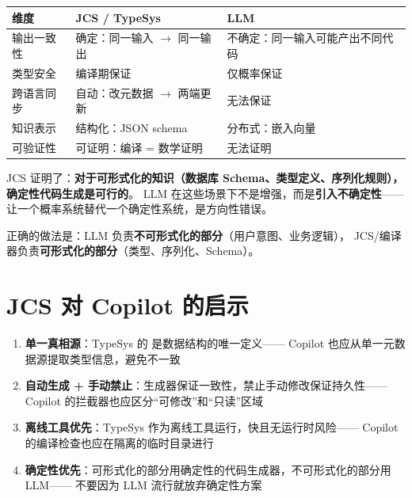 \documentclass[10pt, openany]{book}
\begin{document}
\begin{table}[h]
\centering
\begin{tabular}{p{4cm} p{5cm} p{5cm}}
\toprule
\textbf{维度} & \textbf{JCS / TypeSys} & \textbf{LLM} \\
\midrule
输出一致性 & 确定：同一输入 \(\to\) 同一输出 & 不确定：同一输入可能产出不同代码~\cite{Brown2020LanguageModels} \\
类型安全 & 编译期保证~\cite{Pierce2002TAPL} & 仅概率保证 \\
跨语言同步 & 自动：改元数据 \(\to\) 两端更新 & 无法保证 \\
知识表示 & 结构化：JSON schema & 分布式：嵌入向量~\cite{Vaswani2017Attention} \\
可验证性 & 可证明：编译 = 数学证明 & 无法证明 \\
\bottomrule
\end{tabular}
\end{table}

\begin{principle}[确定性的力量]
JCS 证明了：\textbf{对于可形式化的知识（数据库 Schema、类型定义、序列化规则），确定性代码生成是可行的}。
LLM 在这些场景下不是增强，而是\textbf{引入不确定性}——
让一个概率系统替代一个确定性系统，是方向性错误。

正确的做法是：LLM 负责\textbf{不可形式化的部分}（用户意图、业务逻辑），
JCS/编译器负责\textbf{可形式化的部分}（类型、序列化、Schema）。
\end{principle}

\section{JCS 对 Copilot 的启示}

\begin{enumerate}
    \item \textbf{单一真相源}：TypeSys 的  是数据结构的唯一定义——
        Copilot 也应从单一元数据源提取类型信息，避免不一致
    \item \textbf{自动生成 + 手动禁止}：生成器保证一致性，禁止手动修改保证持久性——
        Copilot 的拦截器也应区分``可修改''和``只读''区域
    \item \textbf{离线工具优先}：TypeSys 作为离线工具运行，快且无运行时风险——
        Copilot 的编译检查也应在隔离的临时目录进行
    \item \textbf{确定性优先}：可形式化的部分用确定性的代码生成器，不可形式化的部分用 LLM——
        不要因为 LLM 流行就放弃确定性方案
\end{enumerate}
\end{document}
